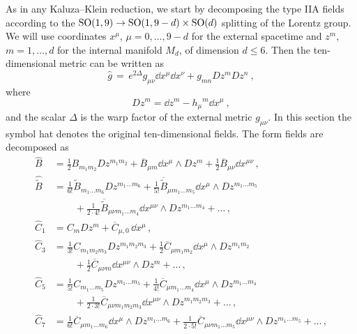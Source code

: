 \documentclass[debug]{phd}
\begin{document}
				As in any Kaluza--Klein reduction, we start by decomposing the type IIA fields according to the $\mathrm{SO}(1,9) \to \mathrm{SO}(1,9-d)\times \mathrm{SO}(d)$ splitting of the Lorentz group. 
				We will use coordinates $x^\mu$, $\mu = 0,\ldots, 9-d$ for the external spacetime and $z^m$, $m=1,\ldots,d$ for the internal manifold $M_d$, of dimension $d \leq 6$. Then the ten-dimensional metric can be written as
						 \begin{equation}\label{KK_decomp_metr}
							\hat{g} \,= \, e^{2\Delta}g_{\mu\nu}\dd{x}^\mu\dd{x}^\nu + g_{mn} Dz^m Dz^n\ ,
						\end{equation}
				where 
						\begin{equation}
							Dz^m = \dd{z}^m - h_\mu{}^m \dd{x}^\mu \ ,
						\end{equation} 
				and the scalar $\Delta$ is the warp factor of the external metric $g_{\mu\nu}$. 
				In this section the symbol hat denotes the original ten-dimensional fields. 
				The form fields are decomposed as
						\begin{equation}\label{expand_10dfields}
							\begin{split}
								\hat{B} &= \tfrac{1}{2} B_{m_1m_2} Dz^{m_1m_2} + \overline{B}_{\mu m} \dd{x}^\mu \wedge Dz^m + \tfrac{1}{2}\overline{B}_{\mu\nu} \dd{x}^{\mu\nu} \, , \\[1.5mm]
								\hat{\tilde{B}} &= \tfrac{1}{6!} \tilde{B}_{m_1\ldots m_6} Dz^{m_1\ldots m_6} + \tfrac{1}{5!} \overline{\tilde B}_{\mu m_1\ldots m_5} \dd{x}^\mu \!\wedge\! Dz^{m_1\ldots m_5} \\
											& \phantom{= + } + \tfrac{1}{2\cdot 4!} \overline{\tilde B}_{\mu\nu m_1\ldots m_4} \dd{x}^{\mu\nu} \!\wedge\! Dz^{m_1\ldots m_4} + \ldots \, , \\[1.5mm]
								\hat{C}_1 &= C_m Dz^m + \overline{C}_{\mu,0} \,\dd{x}^\mu \, , \\[1.5mm]
								\hat{C}_3 &= \tfrac{1}{3!} C_{m_1m_2m_3} D{z}^{m_1m_2m_3} + \tfrac{1}{2}\overline{C}_{\mu m_1m_2} \dd{x}^\mu\wedge D{z}^{m_1m_2} \\
											& \phantom{= + } + \tfrac{1}{2}\overline{C}_{\mu\nu m}\dd{x}^{\mu\nu} \wedge Dz^m + \ldots \, , \\[1.5mm]
								\hat{C}_5 &= \tfrac{1}{5!} C_{m_1\ldots m_5} D{z}^{m_1\ldots m_5} + \tfrac{1}{4!}\overline{C}_{\mu m_1\ldots m_4} \dd{x}^\mu\!\wedge\! D{z}^{m_1\ldots m_4} \\
											& \phantom{= + } +\tfrac{1}{2\cdot 3!} \overline{C}_{\mu\nu m_1m_2m_3}\dd{x}^{\mu\nu} \!\wedge\! Dz^{m_1m_2m_3}+\ldots \, , \\[1.5mm]
								\hat{C}_7 &= \tfrac{1}{6!}\overline{C}_{\mu m_1\ldots m_6} \dd{x}^\mu\wedge D{z}^{m_1\ldots m_6} +\tfrac{1}{2\cdot 5!} \overline{C}_{\mu\nu m_1\ldots m_5}\dd{x}^{\mu\nu} \wedge Dz^{m_1 \ldots m_5} + \ldots \, ,
							\end{split}
						\end{equation}
\end{document}
